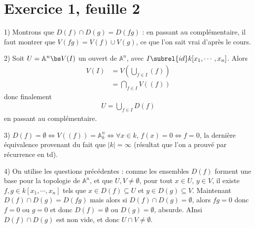 \documentclass[11pt]{article}
\begin{document}
\section*{Exercice 1, feuille 2}
    \begin{question}{1)}
        Montrons que $D(f) \cap D(g) = D(fg)$ : en passant au complémentaire, il faut montrer que $V(fg) = V(f) \cup V(g)$, ce que l'on sait vrai d'après le cours.
    \end{question}
    \begin{question}{2)}
        Soit $U = \mathbb{A}^n \bs V(I)$ un ouvert de $\mathbb{A}^n$, avec $I \subrel{id} k[x_1, \cdots, x_n]$. Alors
        \begin{align*}
            V(I) &= V\left( \bigcup_{f \in I} (f) \right) \\
            &= \bigcap_{f \in I} V((f))
        \end{align*}
        donc finalement
        \begin{align*}
            U = \bigcup_{f \in I} D(f)
        \end{align*}
        en passant au complémentaire.
    \end{question}
    \begin{question}{3)}
        $D(f) = \emptyset \iff V((f)) = \mathbb{A}^n_k \iff \forall x \in k,\, f(x) = 0 \iff f = 0$, la dernière équivalence provenant du fait que $|k| = \infty$ (résultat que l'on a prouvé par récurrence en td).
    \end{question}
    \begin{question}{4)}
        On utilise les questions précédentes : comme les ensembles $D(f)$ forment une base pour la topologie de $\mathbb{A}^n$, et que $U,V \neq \emptyset$, pour tout $x \in U$, $y \in V$, il existe $f,g \in k[x_1, \cdots, x_n]$ tels que $x \in D(f) \subseteq U$ et $y \in D(g) \subseteq V$. Maintenant $D(f) \cap D(g) = D(fg)$ mais alors si $D(f) \cap D(g) = \emptyset$, alors $fg = 0$ donc $f = 0$ ou $g = 0$ et donc $D(f) = \emptyset$ ou $D(g) = \emptyset$, absurde. AInsi $D(f) \cap D(g)$ est non vide, et donc $U \cap V \neq \emptyset$.
    \end{question}
\end{document}

